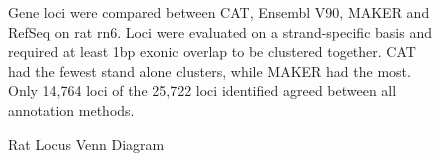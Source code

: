 \documentclass[fleqn,10pt]{wlscirep}
\begin{document}
\begin{figure}
\centering
{}
\caption{Rat Locus Venn Diagram}
Gene loci were compared between CAT, Ensembl V90, MAKER and RefSeq on rat rn6. Loci were evaluated on a strand-specific basis and required at least 1bp exonic overlap to be clustered together. CAT had the fewest stand alone clusters, while MAKER had the most. Only 14,764 loci of the 25,722 loci identified agreed between all annotation methods.
\label{supp_fig:rat_locus_venn}
\end{figure}
\end{document}
